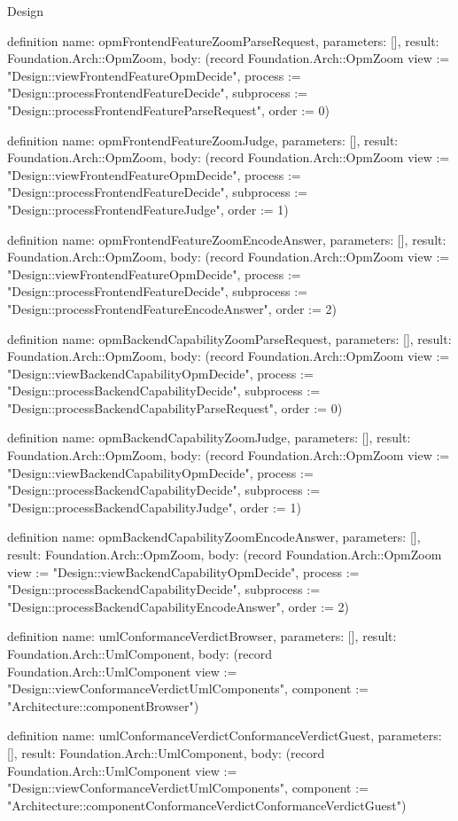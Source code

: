 \begin{lexlean}{Design}
\begin{semanticmodule}
definition{
  name: opmFrontendFeatureZoomParseRequest,
  parameters: [],
  result: Foundation.Arch::OpmZoom,
  body: (record Foundation.Arch::OpmZoom {view := "Design::viewFrontendFeatureOpmDecide", process := "Design::processFrontendFeatureDecide", subprocess := "Design::processFrontendFeatureParseRequest", order := 0})
}

definition{
  name: opmFrontendFeatureZoomJudge,
  parameters: [],
  result: Foundation.Arch::OpmZoom,
  body: (record Foundation.Arch::OpmZoom {view := "Design::viewFrontendFeatureOpmDecide", process := "Design::processFrontendFeatureDecide", subprocess := "Design::processFrontendFeatureJudge", order := 1})
}

definition{
  name: opmFrontendFeatureZoomEncodeAnswer,
  parameters: [],
  result: Foundation.Arch::OpmZoom,
  body: (record Foundation.Arch::OpmZoom {view := "Design::viewFrontendFeatureOpmDecide", process := "Design::processFrontendFeatureDecide", subprocess := "Design::processFrontendFeatureEncodeAnswer", order := 2})
}

definition{
  name: opmBackendCapabilityZoomParseRequest,
  parameters: [],
  result: Foundation.Arch::OpmZoom,
  body: (record Foundation.Arch::OpmZoom {view := "Design::viewBackendCapabilityOpmDecide", process := "Design::processBackendCapabilityDecide", subprocess := "Design::processBackendCapabilityParseRequest", order := 0})
}

definition{
  name: opmBackendCapabilityZoomJudge,
  parameters: [],
  result: Foundation.Arch::OpmZoom,
  body: (record Foundation.Arch::OpmZoom {view := "Design::viewBackendCapabilityOpmDecide", process := "Design::processBackendCapabilityDecide", subprocess := "Design::processBackendCapabilityJudge", order := 1})
}

definition{
  name: opmBackendCapabilityZoomEncodeAnswer,
  parameters: [],
  result: Foundation.Arch::OpmZoom,
  body: (record Foundation.Arch::OpmZoom {view := "Design::viewBackendCapabilityOpmDecide", process := "Design::processBackendCapabilityDecide", subprocess := "Design::processBackendCapabilityEncodeAnswer", order := 2})
}

definition{
  name: umlConformanceVerdictBrowser,
  parameters: [],
  result: Foundation.Arch::UmlComponent,
  body: (record Foundation.Arch::UmlComponent {view := "Design::viewConformanceVerdictUmlComponents", component := "Architecture::componentBrowser"})
}

definition{
  name: umlConformanceVerdictConformanceVerdictGuest,
  parameters: [],
  result: Foundation.Arch::UmlComponent,
  body: (record Foundation.Arch::UmlComponent {view := "Design::viewConformanceVerdictUmlComponents", component := "Architecture::componentConformanceVerdictConformanceVerdictGuest"})
}


\end{semanticmodule}
\end{lexlean}
